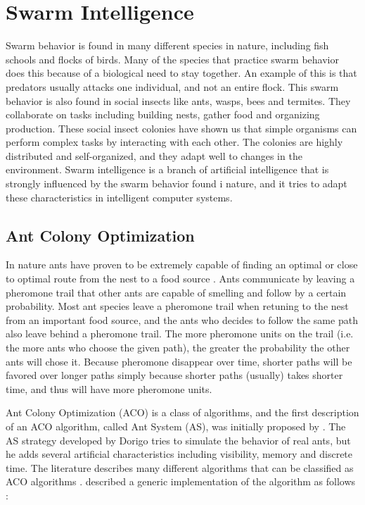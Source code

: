 \section{Swarm Intelligence}

Swarm behavior is found in many different species in nature, including fish schools and flocks of birds. Many of the species that practice swarm behavior does this because of a biological need to stay together. An example of this is that predators usually attacks one individual, and not an entire flock. This swarm behavior is also found in social insects like ants, wasps, bees and termites. They collaborate on tasks including building nests, gather food and organizing production. These social insect colonies have shown us that simple organisms can perform complex tasks by interacting with each other. The colonies are highly distributed and self-organized, and they adapt well to changes in the environment. Swarm intelligence \citep{beni89} is a branch of artificial intelligence that is strongly influenced by the swarm behavior found i nature, and it tries to adapt these characteristics in intelligent computer systems.

\subsection{Ant Colony Optimization}
In nature ants have proven to be extremely capable of finding an optimal or close to optimal route from the nest to a food source \citep{deneubourg90}. Ants communicate by leaving a pheromone trail that other ants are capable of smelling and follow by a certain probability. Most ant species leave a pheromone trail when retuning to the nest from an important food source, and the ants who decides to follow the same path also leave behind a pheromone trail. The more pheromone units on the trail (i.e. the more ants who choose the given path), the greater the probability the other ants will chose it. Because pheromone disappear over time, shorter paths will be favored over longer paths simply because shorter paths (usually) takes shorter time, and thus will have more pheromone units. 

Ant Colony Optimization (ACO) is a class of algorithms, and the first description of an ACO algorithm, called Ant System (AS), was initially proposed by \citet{dorigo96}. The AS strategy developed by Dorigo tries to simulate the behavior of real ants, but he adds several artificial characteristics including visibility, memory and discrete time. The literature describes many different algorithms that can be classified as ACO algorithms \citep{salehi-nezhad07,tripathi09,jiang10, dias14}. \citet{nanda11} described a generic implementation of the algorithm as follows \\:


